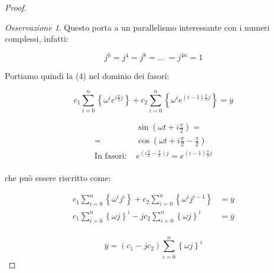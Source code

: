 \documentclass[11pt,italian]{article}
\theoremstyle{remark}
\newtheorem*{mdproposition}{Osservazione}
\newenvironment{remark}%
	{\begin{mdframed}[backgroundcolor=White]\begin{mdproposition}}%
	{\end{mdproposition}\end{mdframed}}
\begin{document}
\begin{proof}
\begin{remark}
        Questo porta a un parallelismo interessante con i numeri complessi, infatti:

        \[ j^0 = j^4 = j^8 = \dots\ = j^{4n} = 1 \]
    \end{remark}

    Portiamo quindi la (4) nel dominio dei fasori:

    \begin{minipage}{0.65\textwidth}
        \begin{equation*}
            c_1 \sum_{i=0}^n \left\{ \omega^i e^{i\frac{\pi}{2} j} \right\} + c_2 \sum_{i=0}^n \left\{ \omega^i e^{{(i-1)}\frac{\pi}{2} j} \right\} = \overline{y}
        \end{equation*}
    \end{minipage}
    \begin{minipage}{0.35\textwidth}

        \begin{mdframed}[linecolor=CadetBlue]
            \color{CadetBlue}
            \small
            \begin{align*}
                                    &
                \sin\left( \omega t + i \frac{\pi}{2} \right) =                                                     \\
                =                   & \cos\left(\omega t + i \frac{\pi}{2} - \frac{\pi}{2}\right)                   \\
                \mbox{In fasori:\ } & e^{\left(i \frac{\pi}{2} - \frac{\pi}{2}\right) j} = e^{(i-1)\frac{\pi}{2} j} \\
            \end{align*}
        \end{mdframed}
    \end{minipage}

    \newpage

    che può essere riscritto come:

    \begin{align*}
        c_1 \sum_{i=0}^n \left\{ \omega^i j^i\right\} + c_2 \sum_{i=0}^n \left\{ \omega^i j^{i-1} \right\} & = \overline{y} \\
        c_1 \sum_{i=0}^n \left\{ \omega j \right\}^i  - j c_2 \sum_{i=0}^n \left\{ \omega j \right\}^{i}   & = \overline{y} \\
    \end{align*}

    \[
        \overline{y} = (c_1 - j c_2) \sum_{i=0}^n \left\{\omega j \right\}^i
    \]


\end{proof}
\end{document}
